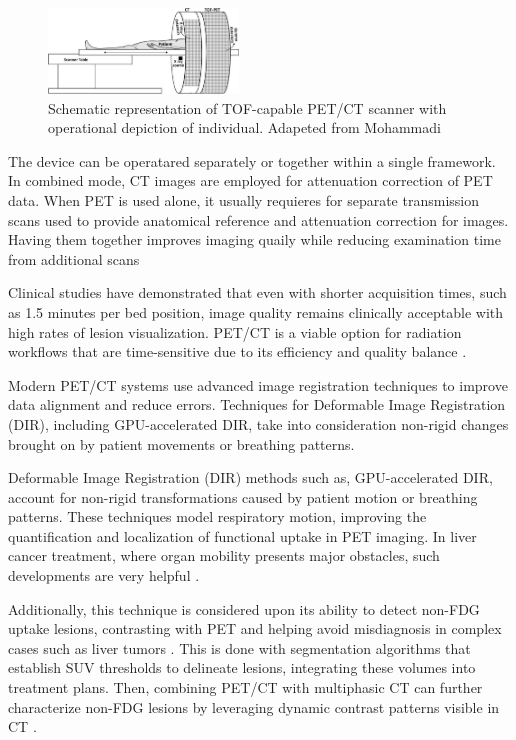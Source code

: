\begin{multicols}{2}
\begin{figure}[H]
	\centering
	\includegraphics[width=0.45\textwidth]{assets/PETCTtable.jpg} 
	\caption{Schematic representation of TOF-capable PET/CT scanner with operational depiction of individual. Adapeted from Mohammadi \cite{figPETCT}}
	\label{fig:PETCTtable} 
\end{figure}

The device can be operatared separately or together within a single framework. In combined mode, CT images are employed for attenuation correction of PET data. When PET is used alone, it usually requieres for separate transmission scans used to provide anatomical reference and attenuation correction for images. Having them together improves imaging quaily while reducing examination time from additional scans \cite{townsend2004}%

Clinical studies have demonstrated that even with shorter acquisition times, such as 1.5 minutes per bed position, image quality remains clinically acceptable with high rates of lesion visualization. PET/CT is a viable option for radiation workflows that are time-sensitive due to its efficiency and quality balance \cite{hasegawa2012}.


Modern PET/CT systems use advanced image registration techniques to improve data alignment and reduce errors.
Techniques for Deformable Image Registration (DIR), including GPU-accelerated DIR, take into consideration non-rigid changes brought on by patient movements or breathing patterns. 

Deformable Image Registration (DIR) methods such as, GPU-accelerated DIR, account for non-rigid transformations caused by patient motion or breathing patterns. These techniques model respiratory motion, improving the quantification and localization of functional uptake in PET imaging. In liver cancer treatment, where organ mobility presents major obstacles, such developments are very helpful \cite{shi2023}.

Additionally, this technique is considered upon its ability to detect non-FDG uptake lesions, contrasting with PET and helping avoid misdiagnosis in complex cases such as liver tumors \cite{yan2024, decazes2021}. This is done with segmentation algorithms that establish SUV thresholds to delineate lesions, integrating these volumes into treatment plans. Then, combining PET/CT with multiphasic CT can further characterize non-FDG lesions by leveraging dynamic contrast patterns visible in CT \cite{TG174}.


\end{multicols}
